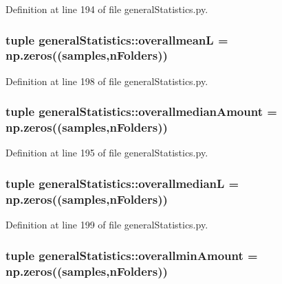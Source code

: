 \-Definition at line 194 of file general\-Statistics.\-py.

\hypertarget{namespacegeneral_statistics_aa01431c8721236c3a11784408d939414}{
\subsubsection[{overallmean\-L}]{\setlength{\rightskip}{0pt plus 5cm}tuple {\bf general\-Statistics\-::overallmean\-L} = np.\-zeros(({\bf samples},{\bf n\-Folders}))}}\label{namespacegeneral_statistics_aa01431c8721236c3a11784408d939414}


\-Definition at line 198 of file general\-Statistics.\-py.

\hypertarget{namespacegeneral_statistics_a7900c747a30a58e5997f39d32538c071}{
\subsubsection[{overallmedian\-Amount}]{\setlength{\rightskip}{0pt plus 5cm}tuple {\bf general\-Statistics\-::overallmedian\-Amount} = np.\-zeros(({\bf samples},{\bf n\-Folders}))}}\label{namespacegeneral_statistics_a7900c747a30a58e5997f39d32538c071}


\-Definition at line 195 of file general\-Statistics.\-py.

\hypertarget{namespacegeneral_statistics_a1d0f3d0b25c12aa4a05ab9f543edf8c7}{
\subsubsection[{overallmedian\-L}]{\setlength{\rightskip}{0pt plus 5cm}tuple {\bf general\-Statistics\-::overallmedian\-L} = np.\-zeros(({\bf samples},{\bf n\-Folders}))}}\label{namespacegeneral_statistics_a1d0f3d0b25c12aa4a05ab9f543edf8c7}


\-Definition at line 199 of file general\-Statistics.\-py.

\hypertarget{namespacegeneral_statistics_aa560b60037e1f655bcbcb7a8e2e243f9}{
\subsubsection[{overallmin\-Amount}]{\setlength{\rightskip}{0pt plus 5cm}tuple {\bf general\-Statistics\-::overallmin\-Amount} = np.\-zeros(({\bf samples},{\bf n\-Folders}))}}\label{namespacegeneral_statistics_aa560b60037e1f655bcbcb7a8e2e243f9}


